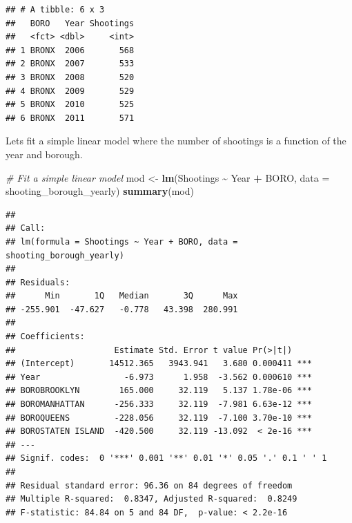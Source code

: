 \documentclass[
]{article}
\newenvironment{Shaded}{\begin{snugshade}}{\end{snugshade}}
\newcommand{\AttributeTok}[1]{\textcolor[rgb]{0.13,0.29,0.53}{#1}}
\newcommand{\CommentTok}[1]{\textcolor[rgb]{0.56,0.35,0.01}{\textit{#1}}}
\newcommand{\FunctionTok}[1]{\textcolor[rgb]{0.13,0.29,0.53}{\textbf{#1}}}
\newcommand{\NormalTok}[1]{#1}
\newcommand{\OtherTok}[1]{\textcolor[rgb]{0.56,0.35,0.01}{#1}}
\newcommand{\SpecialCharTok}[1]{\textcolor[rgb]{0.81,0.36,0.00}{\textbf{#1}}}
\newcommand{\StringTok}[1]{\textcolor[rgb]{0.31,0.60,0.02}{#1}}
\begin{document}
\begin{Shaded}
\end{Shaded}

\begin{verbatim}
## # A tibble: 6 x 3
##   BORO   Year Shootings
##   <fct> <dbl>     <int>
## 1 BRONX  2006       568
## 2 BRONX  2007       533
## 3 BRONX  2008       520
## 4 BRONX  2009       529
## 5 BRONX  2010       525
## 6 BRONX  2011       571
\end{verbatim}

Lets fit a simple linear model where the number of shootings is a
function of the year and borough.

\begin{Shaded}
\begin{Highlighting}[]
\CommentTok{\# Fit a simple linear model}
\NormalTok{mod }\OtherTok{\textless{}{-}} \FunctionTok{lm}\NormalTok{(Shootings }\SpecialCharTok{\textasciitilde{}}\NormalTok{ Year }\SpecialCharTok{+}\NormalTok{ BORO, }\AttributeTok{data =}\NormalTok{ shooting\_borough\_yearly)}
\FunctionTok{summary}\NormalTok{(mod)}
\end{Highlighting}
\end{Shaded}

\begin{verbatim}
## 
## Call:
## lm(formula = Shootings ~ Year + BORO, data = shooting_borough_yearly)
## 
## Residuals:
##      Min       1Q   Median       3Q      Max 
## -255.901  -47.627   -0.778   43.398  280.991 
## 
## Coefficients:
##                    Estimate Std. Error t value Pr(>|t|)    
## (Intercept)       14512.365   3943.941   3.680 0.000411 ***
## Year                 -6.973      1.958  -3.562 0.000610 ***
## BOROBROOKLYN        165.000     32.119   5.137 1.78e-06 ***
## BOROMANHATTAN      -256.333     32.119  -7.981 6.63e-12 ***
## BOROQUEENS         -228.056     32.119  -7.100 3.70e-10 ***
## BOROSTATEN ISLAND  -420.500     32.119 -13.092  < 2e-16 ***
## ---
## Signif. codes:  0 '***' 0.001 '**' 0.01 '*' 0.05 '.' 0.1 ' ' 1
## 
## Residual standard error: 96.36 on 84 degrees of freedom
## Multiple R-squared:  0.8347, Adjusted R-squared:  0.8249 
## F-statistic: 84.84 on 5 and 84 DF,  p-value: < 2.2e-16
\end{verbatim}
\end{document}
